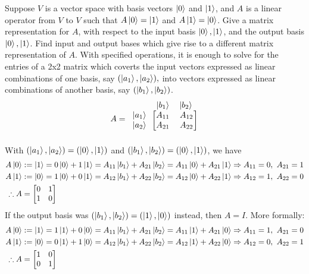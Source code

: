  Suppose $V$ is a vector space with basis vectors $\ket{0}$ and $\ket{1}$, and $A$ is a linear operator
from $V$ to $V$ such that $A\ket{0}=\ket{1}$ and $A\ket{1}=\ket{0}$.  Give a matrix representation for $A$, with
respect to the input basis $\ket{0},\ket{1}$, and the output basis $\ket{0},\ket{1}$.  Find input and output bases which
give rise to a different matrix representation of $A$.
\Soln With specified operations, it is enough to solve for the entries of a 2x2 matrix which
coverts the input vectors expressed as linear combinations of one basis, say $(\ket{a_1},\ket{a_2}),$
into vectors expressed as linear combinations of another basis, say $(\ket{b_1},\ket{b_2})$.
\[
A = \begin{blockarray}{ccc}
\begin{block}{ccc}
& \ket{b_1} & \ket{b_2}\\
    \end{block}
\begin{block}{ c[cc] }
\ket{a_1} & A_{11} & A_{12} \\
\ket{a_2} & A_{21} & A_{22} \\
            \end{block}
        \end{blockarray}
\]
With $(\ket{a_1},\ket{a_2}) = (\ket{0},\ket{1})$ and $(\ket{b_1},\ket{b_2}) = (\ket{0},\ket{1})$, we have
\begin{align*}
	A\ket{0} &:= \ket{1} = 0\ket{0}+1\ket{1}= A_{11}\ket{b_1} + A_{21}\ket{b_2} = A_{11}\ket{0} + A_{21}\ket{1}\Rightarrow A_{11} = 0,\ A_{21} = 1\\
	A\ket{1} &:= \ket{0} = 1\ket{0}+0\ket{1}=A_{12}\ket{b_1} + A_{22}\ket{b_2} = A_{12}\ket{0} + A_{22}\ket{1}\Rightarrow A_{12} = 1,\ A_{22} = 0\\
%
	\therefore A &=
	\begin{bmatrix}
		0 & 1 \\
		1 & 0
	\end{bmatrix}
\end{align*}
If the output basis was $(\ket{b_1},\ket{b_2}) = (\ket{1},\ket{0})$ instead, then $A=I$.  More formally:
\begin{align*}
    A\ket{0} &:= \ket{1} = 1\ket{1}+0\ket{0}= A_{11}\ket{b_1} + A_{21}\ket{b_2} = A_{11}\ket{1} + A_{21}\ket{0}\Rightarrow A_{11} = 1,\ A_{21} = 0\\
    A\ket{1} &:= \ket{0} = 0\ket{1}+1\ket{0}= A_{12}\ket{b_1} + A_{22}\ket{b_2} = A_{12}\ket{1} + A_{22}\ket{0}\Rightarrow A_{12} = 0,\ A_{22} = 1\\
    \therefore A &=
    \begin{bmatrix}
    1 & 0 \\
    0 & 1
    \end{bmatrix}
\end{align*}
